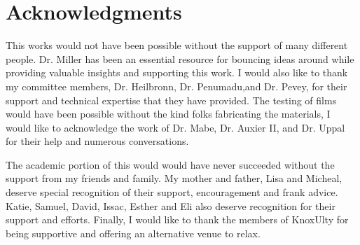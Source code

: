 \chapter*{Acknowledgments}

This works would not have been possible without the support of many different people.
Dr. Miller has been an essential resource for bouncing ideas around while providing valuable insights and supporting this work.
I would also like to thank my committee members, Dr. Heilbronn, Dr. Penumadu,and Dr. Pevey, for their support and technical expertise that they have provided. 
The testing of films would have been possible without the kind folks fabricating the materials, I would like to acknowledge the work of Dr. Mabe, Dr. Auxier II, and Dr. Uppal for their help and numerous conversations.

The academic portion of this would would have never succeeded without the support from my friends and family. 
My mother and father, Lisa and Micheal, deserve special recognition of their support, encouragement and frank advice. 
Katie, Samuel, David, Issac, Esther and Eli also deserve recognition for their support and efforts. 
Finally, I would like to thank the members of KnoxUlty for being supportive and offering an alternative venue to relax.
